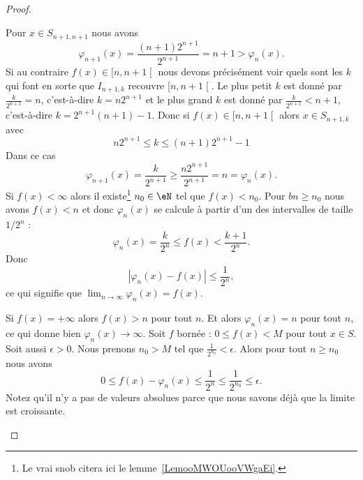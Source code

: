 \begin{proof}
\begin{subproof}
		Pour \( x\in S_{n+1,\overline{ n+1 }}\) nous avons
		\begin{equation}
			\varphi_{n+1}(x)=\frac{ (n+1)2^{n+1} }{ 2^{n+1} }=n+1>\varphi_n(x).
		\end{equation}
		Si au contraire \( f(x)\in\mathopen[ n , n+1 \mathclose[ \) nous devons précisément voir quels sont les \( k\) qui font en sorte que \( I_{n+1,k}\) recouvre \( \mathopen[ n , n+1 \mathclose[\). Le plus petit \( k\) est donné par \( \frac{ k }{ 2^{n+1} }=n\), c'est-à-dire \( k=n2^{n+1}\) et le plus grand \( k\) est donné par \( \frac{ k }{ 2^{n+1} }<n+1\), c'est-à-dire \( k=2^{n+1}(n+1)-1\). Donc si \( f(x)\in\mathopen[ n , n+1 \mathclose[\) alors \( x\in S_{n+1,k}\) avec
		\begin{equation}
			n2^{n+1}\leq k\leq (n+1)2^{n+1}-1
		\end{equation}
		Dans ce cas
		\begin{equation}
			\varphi_{n+1}(x)=\frac{ k }{ 2^{n+1} }\geq \frac{ n2^{n+1} }{ 2^{n+1} }=n=\varphi_n(x).
		\end{equation}
		Si \( f(x)<\infty\) alors il existe\footnote{Le vrai snob citera ici le lemme~\ref{LemooMWOUooVWgaEi}.} \( n_0\in\eN\) tel que \( f(x)<n_0\). Pour \( bn\geq n_0\) nous avons \( f(x)<n\) et donc \( \varphi_n(x)\) se calcule à partir d'un des intervalles de taille \( 1/2^n\) :
		\begin{equation}
			\varphi_n(x)=\frac{ k }{ 2^n }\leq f(x)<\frac{ k+1 }{ 2^n }.
		\end{equation}
		Donc
		\begin{equation}
			| \varphi_n(x)-f(x) |\leq \frac{1}{ 2^n },
		\end{equation}
		ce qui signifie que \( \lim_{n\to \infty} \varphi_n(x)=f(x)\).

		Si \( f(x)=+\infty\) alors \( f(x)>n\) pour tout \( n\). Et alors \( \varphi_n(x)=n\) pour tout \( n\), ce qui donne bien \( \varphi_n(x)\to \infty\).
		Soit \( f\) bornée : \( 0\leq f(x)<M\) pour tout \( x\in S\). Soit aussi \( \epsilon>0\). Nous prenons \( n_0>M\) tel que \( \frac{1}{ 2^{n_0} }<\epsilon\). Alors pour tout \( n\geq n_0\) nous avons
		\begin{equation}
			0\leq f(x)-\varphi_n(x)\leq \frac{1}{ 2^n }\leq \frac{1}{ 2^{n_0} }\leq \epsilon.
		\end{equation}
		Notez qu'il n'y a pas de valeurs absolues parce que nous savons déjà que la limite est croissante.
	\end{subproof}
\end{proof}

